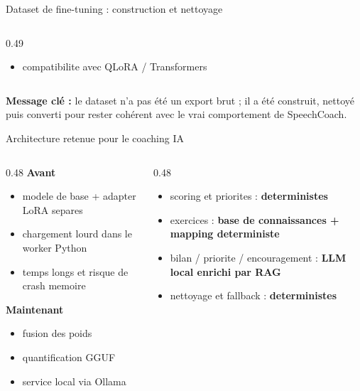 ﻿\documentclass[10pt,aspectratio=169]{beamer}
\begin{document}
\begin{frame}{Dataset de fine-tuning : construction et nettoyage}
\begin{columns}[T]
\begin{column}{0.49\textwidth}
\begin{tcolorbox}[title=Structure des données, colframe=success, colback=success!4]
\begin{itemize}
    \item compatibilite avec QLoRA / Transformers
\end{itemize}
\end{tcolorbox}
\end{column}
\end{columns}
\vspace{0.25cm}
\begin{tcolorbox}[colback=secondary!45,colframe=primary!25]
\small \textbf{Message clé :} le dataset n'a pas été un export brut ; il a été construit, nettoyé puis converti pour rester cohérent avec le vrai comportement de SpeechCoach.
\end{tcolorbox}
\end{frame}

\begin{frame}{Architecture retenue pour le coaching IA}
\begin{columns}[T]
\begin{column}{0.48\textwidth}
\textbf{Avant}
\begin{itemize}
    \item modele de base + adapter LoRA separes
    \item chargement lourd dans le worker Python
    \item temps longs et risque de crash memoire
\end{itemize}
\vspace{0.2cm}
\textbf{Maintenant}
\begin{itemize}
    \item fusion des poids
    \item quantification GGUF
    \item service local via Ollama
\end{itemize}
\end{column}
\begin{column}{0.48\textwidth}
\begin{tcolorbox}[title=Architecture actuelle, colframe=success, colback=success!4]
\small
\begin{itemize}
    \item scoring et priorites : \textbf{deterministes}
    \item exercices : \textbf{base de connaissances + mapping deterministe}
    \item bilan / priorite / encouragement : \textbf{LLM local enrichi par RAG}
    \item nettoyage et fallback : \textbf{deterministes}
\end{itemize}
\end{tcolorbox}

\end{column}
\end{columns}
\end{frame}
\end{document}
